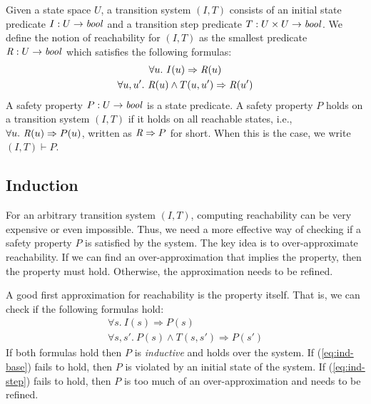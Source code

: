 Given a state space $U$, a transition system $(I,T)$ consists of an
initial state predicate $I : U \to \mathit{bool}$ and a transition step
predicate $T : U \times U \to \mathit{bool}$.
We define the notion of
reachability for $(I, T)$ as the smallest predicate $\mathit{R} : U \to
\mathit{bool}$ which satisfies the following formulas:
\begin{gather*}
  \forall u.~ I(u) \Rightarrow \mathit{R}(u) \\
  \forall u, u'.~ \mathit{R}(u) \land T(u, u') \Rightarrow \mathit{R}(u')
\end{gather*}
A safety property $P : U \to \mathit{bool}$ is a state predicate. A safety
property $P$ holds on a transition system $(I, T)$ if it holds on all
reachable states, i.e., $\forall u.~ \mathit{R}(u) \Rightarrow P(u)$,
written as $\mathit{R} \Rightarrow P$ for short. When this is the case, we
write $(I, T)\vdash P$.

\subsection{Induction}
\label{sec:induction}
For an arbitrary transition system $(I, T)$, computing reachability
can be very expensive or even impossible. Thus, we need a more
effective way of checking if a safety property $P$ is satisfied by the
system. The key idea is to over-approximate reachability. If we can
find an over-approximation that implies the property, then the
property must hold. Otherwise, the approximation needs to be refined.

A good first approximation for reachability is the property itself.
That is, we can check if the following formulas hold:
\begin{gather}
  \forall s.~ I(s) \Rightarrow P(s)
  \label{eq:ind-base} \\
  \forall s, s'.~ P(s) \land T(s, s') \Rightarrow P(s')
  \label{eq:ind-step}
\end{gather}
If both formulas hold then $P$ is {\em inductive} and holds over the
system. If (\ref{eq:ind-base}) fails to hold, then $P$ is violated
by an initial state of the system. If (\ref{eq:ind-step}) fails to
hold, then $P$ is too much of an over-approximation and needs to be
refined.

